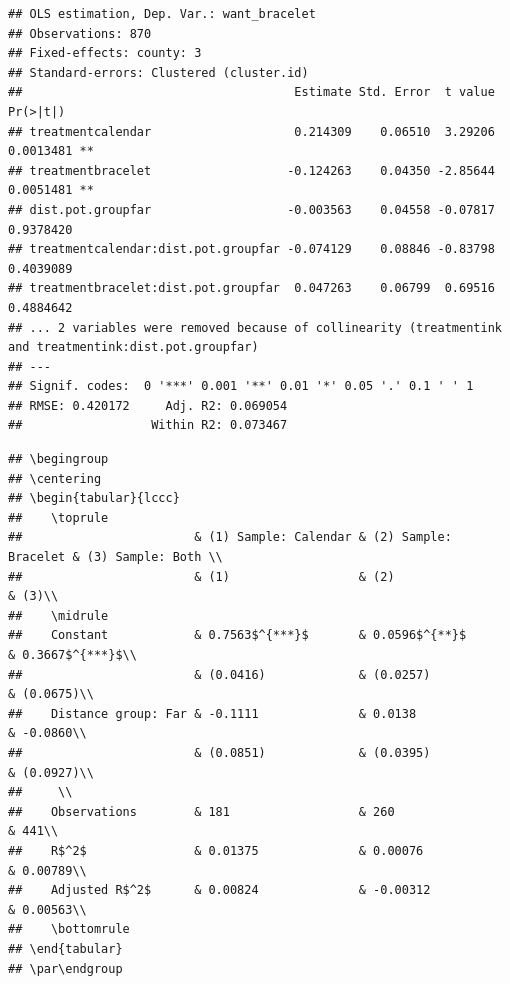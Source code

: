 \documentclass[
]{article}
\begin{document}
\begin{verbatim}
## OLS estimation, Dep. Var.: want_bracelet
## Observations: 870
## Fixed-effects: county: 3
## Standard-errors: Clustered (cluster.id) 
##                                      Estimate Std. Error  t value  Pr(>|t|)    
## treatmentcalendar                    0.214309    0.06510  3.29206 0.0013481 ** 
## treatmentbracelet                   -0.124263    0.04350 -2.85644 0.0051481 ** 
## dist.pot.groupfar                   -0.003563    0.04558 -0.07817 0.9378420    
## treatmentcalendar:dist.pot.groupfar -0.074129    0.08846 -0.83798 0.4039089    
## treatmentbracelet:dist.pot.groupfar  0.047263    0.06799  0.69516 0.4884642    
## ... 2 variables were removed because of collinearity (treatmentink and treatmentink:dist.pot.groupfar)
## ---
## Signif. codes:  0 '***' 0.001 '**' 0.01 '*' 0.05 '.' 0.1 ' ' 1
## RMSE: 0.420172     Adj. R2: 0.069054
##                  Within R2: 0.073467
\end{verbatim}

\begin{verbatim}
## \begingroup
## \centering
## \begin{tabular}{lccc}
##    \toprule
##                        & (1) Sample: Calendar & (2) Sample: Bracelet & (3) Sample: Both \\   
##                        & (1)                  & (2)                  & (3)\\  
##    \midrule 
##    Constant            & 0.7563$^{***}$       & 0.0596$^{**}$        & 0.3667$^{***}$\\   
##                        & (0.0416)             & (0.0257)             & (0.0675)\\   
##    Distance group: Far & -0.1111              & 0.0138               & -0.0860\\   
##                        & (0.0851)             & (0.0395)             & (0.0927)\\   
##     \\
##    Observations        & 181                  & 260                  & 441\\  
##    R$^2$               & 0.01375              & 0.00076              & 0.00789\\  
##    Adjusted R$^2$      & 0.00824              & -0.00312             & 0.00563\\  
##    \bottomrule
## \end{tabular}
## \par\endgroup
\end{verbatim}
\end{document}
